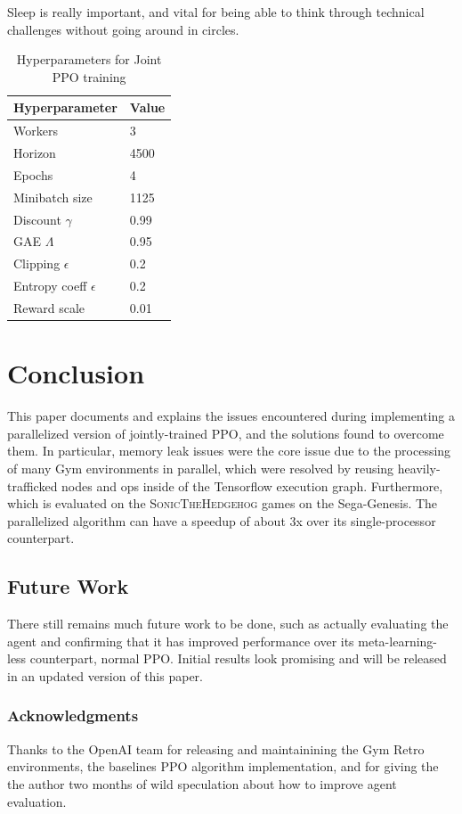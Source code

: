 \documentclass{article}
\begin{document}
Sleep is really important, and vital for being able to think through technical challenges without going around in circles.

\begin{table}
  \caption{Hyperparameters for Joint PPO training}
  \label{sample-table}
  \centering
  \begin{tabular}{ll}
    \toprule
    \cmidrule(r){1-2}
    Hyperparameter    & Value \\
    \midrule
    Workers & 3 \\
    Horizon & 4500 \\
    Epochs & 4 \\
    Minibatch size & 1125 \\
    Discount $\gamma$ & 0.99 \\
    GAE $\Lambda$ & 0.95 \\
    Clipping $\epsilon$ & 0.2 \\
    Entropy coeff $\epsilon$ & 0.2 \\
    Reward scale & 0.01 \\
    \bottomrule
  \end{tabular}
\end{table}

\section{Conclusion}

This paper documents and explains the issues encountered during implementing a parallelized version of jointly-trained PPO, and the solutions found to overcome them. In particular, memory leak issues were the core issue due to the processing of many Gym environments in parallel, which were resolved by reusing heavily-trafficked nodes and ops inside of the Tensorflow execution graph. Furthermore, which is evaluated on the \textsc{SonicTheHedgehog} games on the Sega-Genesis. The parallelized algorithm can have a speedup of about 3x over its single-processor counterpart.

\subsection{Future Work}
There still remains much future work to be done, such as actually evaluating the agent and confirming that it has improved performance over its meta-learning-less counterpart, normal PPO. Initial results look promising and will be released in an updated version of this paper.

\subsubsection*{Acknowledgments}

Thanks to the OpenAI team for releasing and maintainining the Gym Retro environments, the baselines PPO algorithm implementation, and for giving the the author two months of wild speculation about how to improve agent evaluation. 

\medskip 

\small



\end{document}
